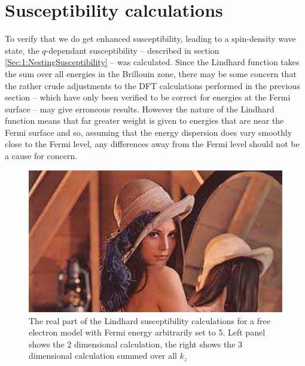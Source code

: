 
\section{Susceptibility calculations}
    \label{Sec:3:SubsceptibilityCalculation}


To verify that we do get enhanced susceptibility, leading to a spin-density wave state, the $q$-dependant susceptibility -- described in section \ref{Sec:1:NestingSusceptibility} -- was calculated. Since the Lindhard function takes the sum over all energies in the Brillouin zone, there may be some concern that the rather crude adjustments to the DFT calculations performed in the previous section -- which have only been verified to be correct for energies at the Fermi surface -- may give erroneous results. However the nature of the Lindhard function means that far greater weight is given to energies that are near the Fermi surface and so, assuming that the energy dispersion does vary smoothly close to the Fermi level, any differences away from the Fermi level should not be a cause for concern.

\begin{figure}[h!]
    \begin{center}
        \includegraphics[scale=0.9]{Misc/TODO}
        \caption{The real part of the Lindhard susceptibility calculations for a free electron model with Fermi energy arbitrarily set to 5. Left panel shows the 2 dimensional calculation, the right shows the 3 dimensional calculation summed over all $k_z$}
        \label{Fig:3:FreeElectronSusceptibility}
    \end{center}
\end{figure}

